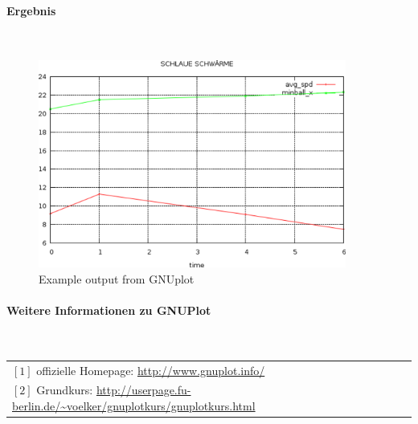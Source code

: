 \paragraph{Ergebnis}~\\

\begin{figure}
	\includegraphics[width=0.9\textwidth]{stats-howto-gnuplot.png}
	\caption{Example output from GNUplot}
\end{figure}


\paragraph{Weitere Informationen zu GNUPlot}~\\

\begin{tabular}{l}
 $[1]$ offizielle Homepage: \url{http://www.gnuplot.info/} \\
 $[2]$ Grundkurs: \url{http://userpage.fu-berlin.de/~voelker/gnuplotkurs/gnuplotkurs.html}
\end{tabular}